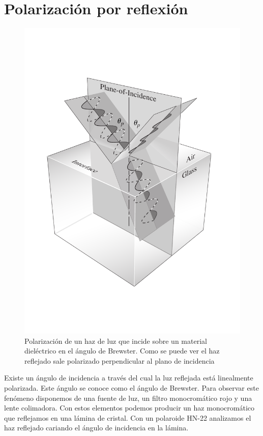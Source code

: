 \documentclass[12pt]{article}
\numberwithin{table}{section}
\numberwithin{figure}{section}
\numberwithin{equation}{section}
\begin{document}
\section{Polarización por reflexión}
\begin{figure}[htb]
	\small \centering \sffamily
	\includegraphics[scale = 0.4]{brewster.pdf}
	\caption{Polarización de un haz de luz que incide sobre un material dieléctrico en el ángulo de Brewster. Como se puede ver el haz reflejado sale polarizado perpendicular al plano de incidencia}
	\label{fig:brewster}
\end{figure}

Existe un ángulo de incidencia a través del cual la luz reflejada está linealmente polarizada. Este ángulo se conoce como el ángulo de Brewster. Para observar este fenómeno disponemos de una fuente de luz, un filtro monocromático rojo y una lente colimadora. Con estos elementos podemos producir un haz monocromático que reflejamos en una lámina de cristal. Con un polaroide HN-22 analizamos el haz reflejado cariando el ángulo de incidencia en la lámina.
\end{document}
